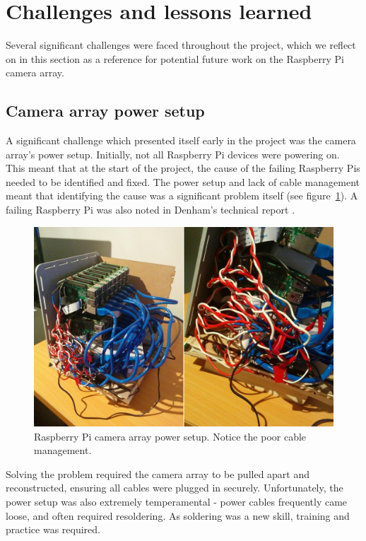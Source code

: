 \documentclass[../main.tex]{subfiles}
\begin{document}
\section{Challenges and lessons learned} \label{sec:challenges}
Several significant challenges were faced throughout the project, which we reflect on in this section as a reference for potential future work on the Raspberry Pi camera array.

\subsection{Camera array power setup} \label{sec:challenges-power}
A significant challenge which presented itself early in the project was the camera array's power setup. Initially, not all Raspberry Pi devices were powering on. This meant that at the start of the project, the cause of the failing Raspberry Pis needed to be identified and fixed. The power setup and lack of cable management meant that identifying the cause was a significant problem itself (see figure~\ref{fig:cable-management}). A failing Raspberry Pi was also noted in Denham's technical report \cite{denhamRaspberry}.

\begin{figure}[H]
    \centering
    \includegraphics[width=\linewidth]{images/cable-management}
    \caption{Raspberry Pi camera array power setup. Notice the poor cable management.}
    \label{fig:cable-management}
\end{figure}

Solving the problem required the camera array to be pulled apart and reconstructed, ensuring all cables were plugged in securely. Unfortunately, the power setup was also extremely temperamental - power cables frequently came loose, and often required resoldering. As soldering was a new skill, training and practice was required.
\end{document}
